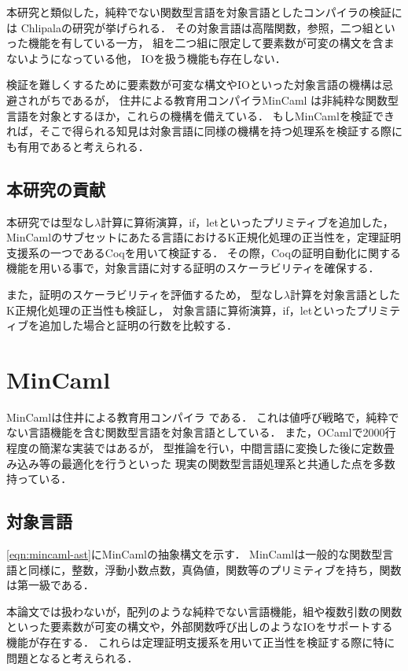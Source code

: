 \documentclass{sumiilab-paper}
\begin{document}
本研究と類似した，純粋でない関数型言語を対象言語としたコンパイラの検証には
Chlipalaの研究\cite{ImpurePOPL10}が挙げられる．
その対象言語は高階関数，参照，二つ組といった機能を有している一方，
組を二つ組に限定して要素数が可変の構文を含まないようになっている他，
IOを扱う機能も存在しない．

検証を難しくするために要素数が可変な構文やIOといった対象言語の機構は忌避されがちであるが，
住井による教育用コンパイラMinCaml\cite{DBLP:conf/icfp/Sumii05} \cite{MinCaml110006664764}は非純粋な関数型言語を対象とするほか，これらの機構を備えている．
もしMinCamlを検証できれば，そこで得られる知見は対象言語に同様の機構を持つ処理系を検証する際にも有用であると考えられる．

\section{本研究の貢献}
本研究では型なし$\lambda$計算に算術演算，if，letといったプリミティブを追加した，
MinCamlのサブセットにあたる言語におけるK正規化処理の正当性を，定理証明支援系の一つであるCoqを用いて検証する．
その際，Coqの証明自動化に関する機能を用いる事で，対象言語に対する証明のスケーラビリティを確保する．

また，証明のスケーラビリティを評価するため，
型なし$\lambda$計算を対象言語としたK正規化処理の正当性も検証し，
対象言語に算術演算，if，letといったプリミティブを追加した場合と証明の行数を比較する．

\chapter{MinCaml}
MinCamlは住井による教育用コンパイラ\cite{DBLP:conf/icfp/Sumii05} \cite{MinCaml110006664764}である．
これは値呼び戦略で，純粋でない言語機能を含む関数型言語を対象言語としている．
また，OCamlで2000行程度の簡潔な実装ではあるが，
型推論を行い，中間言語に変換した後に定数畳み込み等の最適化を行うといった
現実の関数型言語処理系と共通した点を多数持っている．

\section{対象言語}
\figurename\ref{eqn:mincaml-ast}にMinCamlの抽象構文を示す．
MinCamlは一般的な関数型言語と同様に，整数，浮動小数点数，真偽値，関数等のプリミティブを持ち，関数は第一級である．

本論文では扱わないが，配列のような純粋でない言語機能，組や複数引数の関数といった要素数が可変の構文や，外部関数呼び出しのようなIOをサポートする機能が存在する．
これらは定理証明支援系を用いて正当性を検証する際に特に問題となると考えられる．
\end{document}
